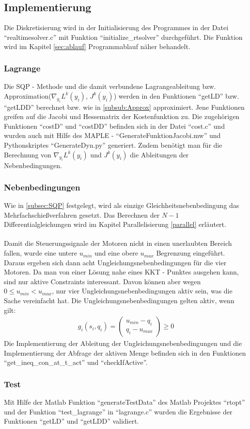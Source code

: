 \subsection{Implementierung}

Die Diskretisierung wird in der Initialisierung des Programmes in der Datei ``realtimesolver.c'' mit Funktion ``initialize\_rtsolver'' durchgeführt. Die Funktion wird im Kapitel \ref{sec:ablauf} Programmablauf  näher behandelt. 

\subsubsection{Lagrange}
Die SQP - Methode und die damit verbundene Lagrangeableitung bzw. Approximation($\nabla_{y_i} L^k(y_i)$, $J^k(y_i)$) werden in den Funktionen ``getLD'' bzw. ``getLDD'' berechnet bzw. wie in \ref{subsub:Approx} approximiert. Jene Funktionen greifen auf die Jacobi und Hessematrix der Kostenfunktion zu. Die zugehörigen Funktionen ``costD'' und ``costDD'' befinden sich in der Datei ``cost.c'' und wurden auch mit Hilfe des MAPLE - ``GenerateFunktionJacobi.mw'' und Pythonskriptes ``GenerateDyn.py'' generiert. Zudem benötigt man für die Berechnung von $\nabla_{y_i} L^k(y_i)$ und $J^k(y_i)$  die Ableitungen der Nebenbedingungen.

\subsubsection{Nebenbedingungen}
Wie in \ref{subsec:SQP} festgelegt, wird als einzige Gleichheitsnebenbedingung das Mehrfachschießverfahren gesetzt. Das Berechnen der $N-1$ Differentialgleichungen wird im Kapitel Parallelisierung \ref{parallel} erläutert.\\
\\
Damit die Steuerungssignale der Motoren nicht in einen unerlaubten Bereich fallen, wurde eine untere $u_{min}$ und eine obere $u_{max}$ Begrenzung eingeführt. Daraus ergeben sich dann acht Ungleichungsnebenbedingungen für die vier Motoren. Da man von einer Lösung nahe eines KKT - Punktes ausgehen kann, sind nur aktive Constraints interessant. Davon können aber wegen $0 \leq u_{min} < u_{max}$, nur vier Ungleichungsnebenbedingungen aktiv sein, was die Sache vereinfacht hat. Die Ungleichungsnebenbedingungen gelten aktiv, wenn gilt:
\begin{align}
  g_i(s_i, q_i) = \begin{pmatrix}
    u_{min} - q_i\\
    q_i - u_{max}
  \end{pmatrix}
  \geq 0
\end{align}
Die Implementierung der Ableitung der Ungleichungsnebenbedingungen und die Implementierung der Abfrage der aktiven Menge befinden sich in den Funktionen ``get\_ineq\_con\_at\_t\_act'' und ``checkIfActive''.
\subsubsection{Test}
Mit Hilfe der Matlab Funktion ``generateTestData'' des Matlab Projektes ``rtopt'' und der Funktion ``test\_lagrange'' in ``lagrange.c'' wurden die Ergebnisse der Funktionen ``getLD'' und ``getLDD'' validiert.





  






